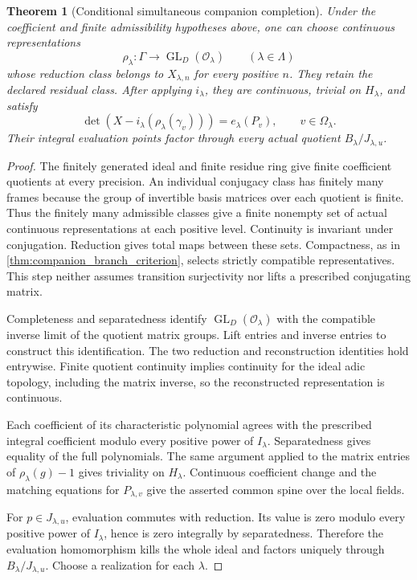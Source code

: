 \documentclass[11pt]{amsart}
\newtheorem{theorem}{Theorem}[section]
\theoremstyle{definition}
\theoremstyle{remark}
\newcommand{\OO}{\mathcal O}
\newcommand{\GL}{\operatorname{GL}}
\begin{document}
\begin{theorem}[Conditional simultaneous companion completion]\label{thm:simultaneous_companion_completion}
Under the coefficient and finite admissibility hypotheses above, one can choose continuous representations
\[
\rho_\lambda:\Gamma\longrightarrow\GL_D(\OO_\lambda)
\qquad(\lambda\in\Lambda)
\]
whose reduction class belongs to \(X_{\lambda,n}\) for every positive \(n\). They retain the declared residual class. After applying \(i_\lambda\), they are continuous, trivial on \(H_\lambda\), and satisfy
\[
\det\!\left(X- i_\lambda(\rho_\lambda(\gamma_v))\right)
=e_\lambda(P_v),\qquad v\in\Omega_\lambda.
\]
Their integral evaluation points factor through every actual quotient \(B_\lambda/J_{\lambda,u}\).
\end{theorem}

\begin{proof}
The finitely generated ideal and finite residue ring give finite coefficient quotients at every precision. An individual conjugacy class has finitely many frames because the group of invertible basis matrices over each quotient is finite. Thus the finitely many admissible classes give a finite nonempty set of actual continuous representations at each positive level. Continuity is invariant under conjugation. Reduction gives total maps between these sets. Compactness, as in \cref{thm:companion_branch_criterion}, selects strictly compatible representatives. This step neither assumes transition surjectivity nor lifts a prescribed conjugating matrix.

Completeness and separatedness identify \(\GL_D(\OO_\lambda)\) with the compatible inverse limit of the quotient matrix groups. Lift entries and inverse entries to construct this identification. The two reduction and reconstruction identities hold entrywise. Finite quotient continuity implies continuity for the ideal adic topology, including the matrix inverse, so the reconstructed representation is continuous.

Each coefficient of its characteristic polynomial agrees with the prescribed integral coefficient modulo every positive power of \(I_\lambda\). Separatedness gives equality of the full polynomials. The same argument applied to the matrix entries of \(\rho_\lambda(g)-1\) gives triviality on \(H_\lambda\). Continuous coefficient change and the matching equations for \(P_{\lambda,v}\) give the asserted common spine over the local fields.

For \(p\in J_{\lambda,u}\), evaluation commutes with reduction. Its value is zero modulo every positive power of \(I_\lambda\), hence is zero integrally by separatedness. Therefore the evaluation homomorphism kills the whole ideal and factors uniquely through \(B_\lambda/J_{\lambda,u}\). Choose a realization for each \(\lambda\).
\end{proof}
\end{document}
